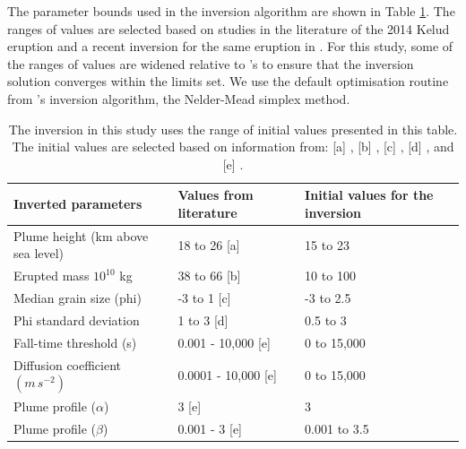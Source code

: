 \documentclass[a4paper,fleqn]{cas-sc}
\begin{document}
The parameter bounds used in the inversion algorithm are shown in Table \ref{tab:eps}. The ranges of values are selected based on studies in the literature of the 2014 Kelud eruption and a recent inversion for the same eruption in \cite{williams2020}. For this study, some of the ranges of values are widened relative to \cite{williams2020}'s to ensure that the inversion solution converges within the limits set. We use the default optimisation routine from \citet{connor2006inversion}'s inversion algorithm, the Nelder-Mead simplex method.

    \begin{table}[]
    \caption{The inversion in this study uses the range of initial values presented in this table. The initial values are selected based on information from: [a] \citet{kristiansen2015stratospheric}, [b] \citet{MAENO201924}, [c] \citet{goode2019insights, MAENO201924}, [d] \citet{goode2019insights, MAENO201924}, and [e] \citet{williams2020}.}
    \label{tab:eps}
    \begin{tabular}{@{}lll@{}}
    \toprule
    Inverted parameters         & 
    Values from literature &
    Initial values for the inversion
     \\ 
    \midrule
    
    Plume height (km above sea level)           &
    18 to 26 [a] &
    15 to 23 
                   \\
    
    Erupted mass $10^{10}$ kg          &
    38 to 66 [b] &
    10 to 100   
                  \\
    
    Median grain size (phi)            & 
    -3 to 1 [c]   &
    -3 to 2.5   
                \\
    
    Phi standard deviation             & 
    1 to 3 [d] &
    0.5 to 3                          
                  \\
    
    Fall-time threshold (s)            & 
    0.001 - 10,000 [e]  &
    0 to 15,000                       
           \\
    
    Diffusion coefficient $(m\,s^{-2})$ & 
    0.0001 - 10,000 [e]  &
    0 to 15,000                       
           \\
    
    Plume profile ($\alpha$)           & 
    3 [e] &
    3                                
            \\
    
    Plume profile ($\beta$)            & 
    0.001 - 3 [e]  &
    0.001 to 3.5                      
           \\ \bottomrule
    \end{tabular}
    \end{table}
\end{document}
